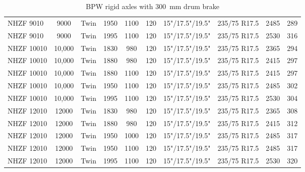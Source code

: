 \begin{table}[H]
\begin{threeparttable}
\begin{tabulary}{\textwidth}{lccccccccc}
    NHZF 9010 & 9000  & Twin  & 1950  & 1100  & 120   & 15"/17.5"/19.5" & 235/75 R17.5 & 2485  & 289 \\
    NHZF 9010 & 9000  & Twin  & 1995  & 1100  & 120   & 15"/17.5"/19.5" & 235/75 R17.5 & 2530  & 316 \\
    NHZF 10010 & 10,000 & Twin  & 1830  & 980   & 120   & 15"/17.5"/19.5" & 235/75 R17.5 & 2365  & 294 \\
    NHZF 10010 & 10,000 & Twin  & 1880  & 980   & 120   & 15"/17.5"/19.5" & 235/75 R17.5 & 2415  & 297 \\
    NHZF 10010 & 10,000 & Twin  & 1880  & 1100  & 120   & 15"/17.5"/19.5" & 235/75 R17.5 & 2415  & 297 \\
    NHZF 10010 & 10,000 & Twin  & 1950  & 1100  & 120   & 15"/17.5"/19.5" & 235/75 R17.5 & 2485  & 302 \\
    NHZF 10010 & 10,000 & Twin  & 1995  & 1100  & 120   & 15"/17.5"/19.5" & 235/75 R17.5 & 2530  & 304 \\
    NHZF 12010 & 12000 & Twin  & 1830  & 980   & 120   & 15"/17.5"/19.5" & 235/75 R17.5 & 2365  & 308 \\
    NHZF 12010 & 12000 & Twin  & 1880  & 980   & 120   & 15"/17.5"/19.5" & 235/75 R17.5 & 2415  & 312 \\
    NHZF 12010 & 12000 & Twin  & 1950  & 1000  & 120   & 15"/17.5"/19.5" & 235/75 R17.5 & 2485  & 317 \\
    NHZF 12010 & 12000 & Twin  & 1950  & 1100  & 120   & 15"/17.5"/19.5" & 235/75 R17.5 & 2485  & 317 \\
    NHZF 12010 & 12000 & Twin  & 1995  & 1100  & 120   & 15"/17.5"/19.5" & 235/75 R17.5 & 2530  & 320 \\
	\bottomrule
	\end{tabulary}

	\caption{BPW rigid axles with 300~mm drum brake}
	\label{table:bpw-rigid-axles-with-300-mm-drum-brake}


	\end{threeparttable}
\end{table}

